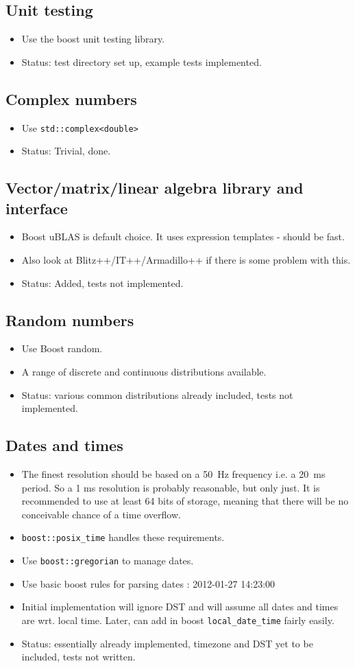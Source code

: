 \documentclass[12pt]{article}
\newcommand{\itm}[1]{\begin{itemize}#1\end{itemize}}
\begin{document}
\subsection{Unit testing}
\itm{
	\item Use the boost unit testing library.
	\item Status: test directory set up, example tests implemented.
}

\subsection{Complex numbers}
\itm{
	\item Use \texttt{std::complex<double>}
	\item Status: Trivial, done.
}

\subsection{Vector/matrix/linear algebra library and interface}
\itm{
	\item Boost uBLAS is default choice. It uses expression templates - should be fast.
	\item Also look at Blitz++/IT++/Armadillo++ if there is some problem with this.
	\item Status: Added, tests not implemented.
}

\subsection{Random numbers}
\itm{
	\item Use Boost random.
	\item A range of discrete and continuous distributions available.
	\item Status: various common distributions already included, tests not implemented.
}

\subsection{Dates and times}
\itm{
	\item The finest resolution should be based on a 50~Hz frequency i.e. a 20~ms period. So a 1 ms resolution is probably reasonable, but only just. It is recommended to use at least 64 bits of storage, meaning that there will be no conceivable chance of a time overflow.
	\item \texttt{boost::posix\_time} handles these requirements.
	\item Use \texttt{boost::gregorian} to manage dates.
	\item Use basic boost rules for parsing dates : 2012-01-27 14:23:00
	\item Initial implementation will ignore DST and will assume all dates and times are wrt. local time. Later, can add in boost \texttt{local\_date\_time} fairly easily.
	\item Status: essentially already implemented, timezone and DST yet to be included, tests not written.
}
\end{document}
